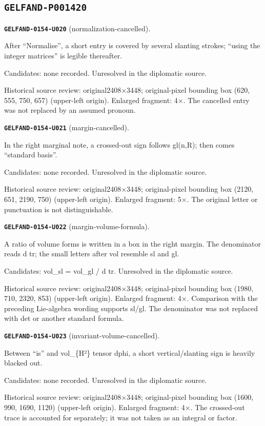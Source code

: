 \subsection*{\texttt{GELFAND-P001420}}
\par\noindent\leavevmode{}\label{GELFAND-0154-U020}\textbf{\texttt{GELFAND-0154-U020}} (normalization-cancelled).\nopagebreak[4]\par
After “Normalise”, a short entry is covered by several slanting strokes; “using the integer matrices” is legible thereafter.\par
Candidates: none recorded. Unresolved in the diplomatic source.\par
Historical source review: original2408×3448; original-pixel bounding box (620, 555, 750, 657) (upper-left origin). Enlarged fragment: 4×. The cancelled entry was not replaced by an assumed pronoun.\par\medskip
\par\noindent\leavevmode{}\label{GELFAND-0154-U021}\textbf{\texttt{GELFAND-0154-U021}} (margin-cancelled).\nopagebreak[4]\par
In the right marginal note, a crossed-out sign follows gl(n,R); then comes “standard basis”.\par
Candidates: none recorded. Unresolved in the diplomatic source.\par
Historical source review: original2408×3448; original-pixel bounding box (2120, 651, 2190, 750) (upper-left origin). Enlarged fragment: 5×. The original letter or punctuation is not distinguishable.\par\medskip
\par\noindent\leavevmode{}\label{GELFAND-0154-U022}\textbf{\texttt{GELFAND-0154-U022}} (margin-volume-formula).\nopagebreak[4]\par
A ratio of volume forms is written in a box in the right margin. The denominator reads d tr; the small letters after vol resemble sl and gl.\par
Candidates: vol\_sl = vol\_gl / d tr. Unresolved in the diplomatic source.\par
Historical source review: original2408×3448; original-pixel bounding box (1980, 710, 2320, 853) (upper-left origin). Enlarged fragment: 4×. Comparison with the preceding Lie-algebra wording supports sl/gl. The denominator was not replaced with det or another standard formula.\par\medskip
\par\noindent\leavevmode{}\label{GELFAND-0154-U023}\textbf{\texttt{GELFAND-0154-U023}} (invariant-volume-cancelled).\nopagebreak[4]\par
Between “is” and vol\_\{H²\} tensor dphi, a short vertical/slanting sign is heavily blacked out.\par
Candidates: none recorded. Unresolved in the diplomatic source.\par
Historical source review: original2408×3448; original-pixel bounding box (1600, 990, 1690, 1120) (upper-left origin). Enlarged fragment: 4×. The crossed-out trace is accounted for separately; it was not taken as an integral or factor.\par\medskip
